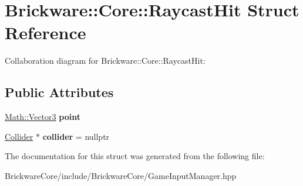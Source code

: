 \hypertarget{structBrickware_1_1Core_1_1RaycastHit}{}\section{Brickware\+:\+:Core\+:\+:Raycast\+Hit Struct Reference}
\label{structBrickware_1_1Core_1_1RaycastHit}


Collaboration diagram for Brickware\+:\+:Core\+:\+:Raycast\+Hit\+:
\subsection*{Public Attributes}
\begin{DoxyCompactItemize}
\item 
\hypertarget{structBrickware_1_1Core_1_1RaycastHit_ae1fd6d03b677624d34241026c74493c8}{}\hyperlink{classBrickware_1_1Math_1_1Vector3}{Math\+::\+Vector3} {\bfseries point}\label{structBrickware_1_1Core_1_1RaycastHit_ae1fd6d03b677624d34241026c74493c8}

\item 
\hypertarget{structBrickware_1_1Core_1_1RaycastHit_ad53d6027785888b5c370ec10356b65a7}{}\hyperlink{classBrickware_1_1Core_1_1Collider}{Collider} $\ast$ {\bfseries collider} = nullptr\label{structBrickware_1_1Core_1_1RaycastHit_ad53d6027785888b5c370ec10356b65a7}

\end{DoxyCompactItemize}


The documentation for this struct was generated from the following file\+:\begin{DoxyCompactItemize}
\item 
Brickware\+Core/include/\+Brickware\+Core/Game\+Input\+Manager.\+hpp\end{DoxyCompactItemize}
